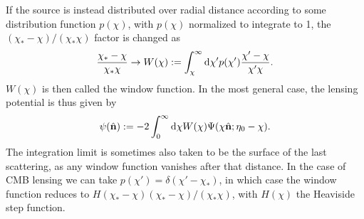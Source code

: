 \documentclass[11pt]{article} %
\DeclareRobustCommand{\d}{\ifmmode\text{d}\else d\fi}
\begin{document}
If the source is instead distributed over radial distance according to some distribution function $p(\chi)$, with $p(\chi)$ normalized to integrate to 1, the $(\chi_* - \chi)/(\chi_*\chi)$ factor is changed as
\begin{equation*}
    \frac{\chi_*-\chi}{\chi_*\chi} \rightarrow W(\chi) := \int_\chi^{\infty}\d\chi' p(\chi')\frac{\chi'-\chi}{\chi'\chi}.
\end{equation*}
$W(\chi)$ is then called the window function. In the most general case, the lensing potential is thus given by
\begin{equation}
    \psi(\hat {\mathbf n}) := -2 \int_0^{\infty}\d \chi W(\chi)\Psi(\chi\hat{\mathbf n};\eta_0 - \chi).
\end{equation}
The integration limit is sometimes also taken to be the surface of the last scattering, as any window function vanishes after that distance. In the case of CMB lensing we can take $p(\chi')=\delta(\chi'-\chi_*)$, in which case the window function reduces to $H(\chi_* - \chi)(\chi_*-\chi)/(\chi_*\chi)$, with $H(\chi)$ the Heaviside step function.

\end{document}
